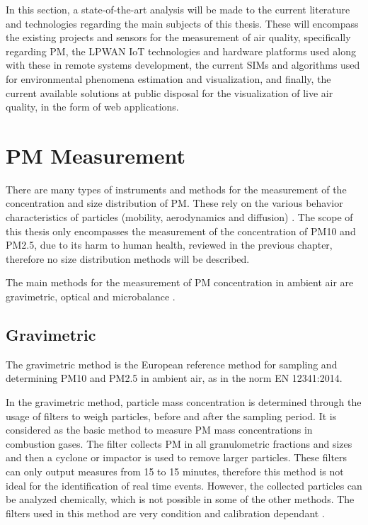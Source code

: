 \cleardoublepage
\label{chap:back}

In this section, a state-of-the-art analysis will be made to the current literature and technologies regarding the main subjects of this thesis. These will encompass the existing projects and sensors for the measurement of air quality, specifically regarding PM, the \ac{LPWAN} IoT technologies and hardware platforms used along with these in remote systems development, the current SIMs and algorithms used for environmental phenomena estimation and visualization, and finally, the current available solutions at public disposal for the visualization of live air quality, in the form of web applications.

\section{PM Measurement}

There are many types of instruments and methods for the measurement of the concentration and size distribution of PM. These rely on the various behavior characteristics of particles (mobility, aerodynamics and diffusion) \cite{Amaral2015}. The scope of this thesis only encompasses the measurement of the concentration of PM10 and PM2.5, due to its harm to human health, reviewed in the previous chapter, therefore no size distribution methods will be described. 

The main methods for the measurement of PM concentration in ambient air are gravimetric, optical and microbalance \cite{Amaral2015}.


\subsection{Gravimetric}

The gravimetric method is the European reference method for sampling and determining PM10 and PM2.5 in ambient air, as in the norm EN 12341:2014. 

In the gravimetric method, particle mass concentration is determined through the usage of filters to weigh particles, before and after the sampling period. It is considered as the basic method to measure PM mass concentrations in combustion gases. The filter collects PM in all granulometric fractions and sizes and then a cyclone or impactor is used to remove larger particles. These filters can only output measures from 15 to 15 minutes, therefore this method is not ideal for the identification of real time events. However, the collected particles can be analyzed chemically, which is not possible in some of the other methods.
The filters used in this method are very condition and calibration dependant \cite{Amaral2015}. 

